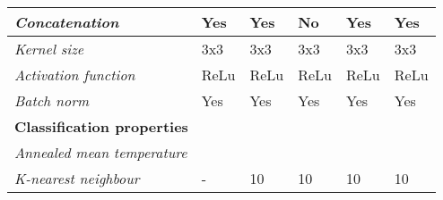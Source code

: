 \begin{table}[]
\begin{tabular}{|l|l|l|l|l|l|}
		\textit{Concatenation}             & Yes                                                               & Yes                                                               & No                                                                & Yes                                                                                      & Yes                                                                            \\ \hline
		\textit{Kernel size}               & 3x3                                                               & 3x3                                                               & 3x3                                                               & 3x3                                                                                      & 3x3                                                                            \\ \hline
		\textit{Activation function}       & ReLu                                                              & ReLu                                                              & ReLu                                                              & ReLu                                                                                     & ReLu                                                                           \\ \hline
		\textit{Batch norm}                & Yes                                                               & Yes                                                               & Yes                                                               & Yes                                                                                      & Yes                                                                            \\ \hline \hline
		\multicolumn{6}{|l|}{\textbf{Classification properties}} \\ \hline  
		\textit{Annealed mean temperature} &                                                                   &                                                                   &                                                                   &                                                                                          &                                                                                \\ \hline
		\textit{K-nearest neighbour}       & -                                                                 & 10                                                                & 10                                                                & 10                                                                                       & 10                                                                             \\ \hline

\end{tabular}
\end{table}
